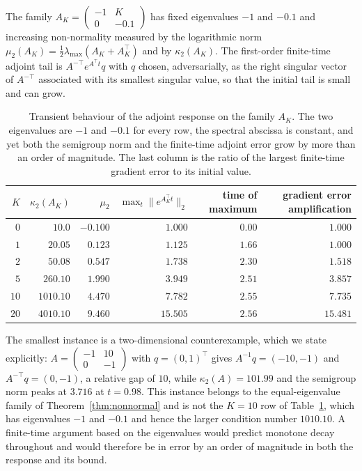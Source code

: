 \documentclass[11pt]{article}
\theoremstyle{definition}
\theoremstyle{remark}
\newcommand{\norm}[1]{\lVert #1 \rVert}
\begin{document}
The family $A_K = \begin{pmatrix} -1 & K \\ 0 & -0.1 \end{pmatrix}$ has fixed eigenvalues
$-1$ and $-0.1$ and increasing non-normality measured by the logarithmic norm
$\mu_2(A_K) = \tfrac12\lambda_{\max}(A_K + A_K^{\top})$ and by $\kappa_2(A_K)$. The first-order
finite-time adjoint tail is $A^{-\top}e^{A^{\top}t}q$ with $q$ chosen, adversarially, as the
right singular vector of $A^{-\top}$ associated with its smallest singular value, so that the
initial tail is small and can grow.

\begin{table}[t]
\centering
\small
\caption{Transient behaviour of the adjoint response on the family $A_K$. The two eigenvalues are
$-1$ and $-0.1$ for every row, the spectral abscissa is constant, and yet both the semigroup norm
and the finite-time adjoint error grow by more than an order of magnitude. The last column is the
ratio of the largest finite-time gradient error to its initial value.}
\label{tab:nonnormal}
\begin{tabular}{rrrrrr}
\toprule
$K$ & $\kappa_2(A_K)$ & $\mu_2$ & $\max_t\norm{e^{A_K^{\top}t}}_2$ & time of maximum & gradient error amplification \\
\midrule
$0$ & $10.0$ & $-0.100$ & $1.000$ & $0.00$ & $1.000$ \\
$1$ & $20.05$ & $0.123$ & $1.125$ & $1.66$ & $1.000$ \\
$2$ & $50.08$ & $0.547$ & $1.738$ & $2.30$ & $1.518$ \\
$5$ & $260.10$ & $1.990$ & $3.949$ & $2.51$ & $3.857$ \\
$10$ & $1010.10$ & $4.470$ & $7.782$ & $2.55$ & $7.735$ \\
$20$ & $4010.10$ & $9.460$ & $15.505$ & $2.56$ & $15.481$ \\
\bottomrule
\end{tabular}
\end{table}

The smallest instance is a two-dimensional counterexample, which we state explicitly:
$A = \begin{pmatrix} -1 & 10 \\ 0 & -1 \end{pmatrix}$ with $q = (0,1)^{\top}$ gives
$A^{-1}q = (-10,-1)$ and $A^{-\top}q = (0,-1)$, a relative gap of $10$, while
$\kappa_2(A) = 101.99$ and the semigroup norm peaks at $3.716$ at $t = 0.98$. This instance
belongs to the equal-eigenvalue family of Theorem~\ref{thm:nonnormal} and is not the $K = 10$ row
of Table~\ref{tab:nonnormal}, which has eigenvalues $-1$ and $-0.1$ and hence the larger condition
number $1010.10$. A finite-time
argument based on the eigenvalues would predict monotone decay throughout and would therefore be
in error by an order of magnitude in both the response and its bound.
\end{document}
